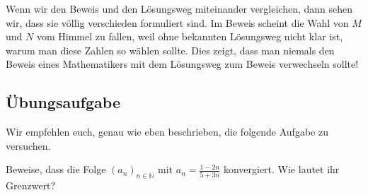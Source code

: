 \documentclass[fontsize=9pt,
               parskip=half-,
               DIV=14,
               listof=chapterentry,
               tocflat]{scrbook}
\begin{document}
Wenn wir den Beweis und den Lösungsweg miteinander vergleichen, dann sehen wir, dass sie völlig verschieden formuliert sind. Im Beweis scheint die Wahl von $M$ und $N$ vom Himmel zu fallen, weil ohne bekannten Lösungsweg nicht klar ist, warum man diese Zahlen so wählen sollte. Dies zeigt, dass man niemals den Beweis eines Mathematikers mit dem Lösungsweg zum Beweis verwechseln sollte!

\subsection{Übungsaufgabe}

Wir empfehlen euch, genau wie eben beschrieben, die folgende Aufgabe zu versuchen.

\begin{exercise*}
Beweise, dass die Folge $(a_{n})_{n\in \mathbb {N} }$ mit $a_{n}={\tfrac {1-2n}{5+3n}}$ konvergiert. Wie lautet ihr Grenzwert?

\end{exercise*}
\end{document}

